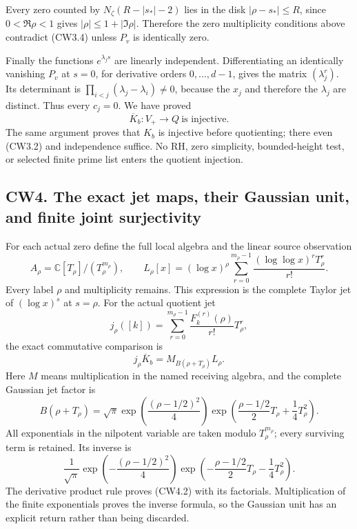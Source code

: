 Every zero counted by \(N_\zeta(R-|s_*|-2)\) lies in the disk
\(|\rho-s_*|\le R\), since \(0<\Re\rho<1\) gives
\(|\rho|\le1+|\Im\rho|\). Therefore the zero multiplicity conditions
above contradict (CW3.4) unless \(P_v\) is identically zero.

Finally the functions \(e^{\lambda_js}\) are linearly independent.
Differentiating an identically vanishing \(P_v\) at \(s=0\), for
derivative orders \(0,\ldots,d-1\), gives the matrix \((\lambda_j^r)\).
Its determinant is \(\prod_{i<j}(\lambda_j-\lambda_i)\ne0\), because the
\(x_j\) and therefore the \(\lambda_j\) are distinct. Thus every
\(c_j=0\). We have proved \[
\boxed{\overline K_b:V_+\longrightarrow Q\ \text{is injective}.}
\tag{CW3.6}
\] The same argument proves that \(K_b\) is injective before
quotienting; there even (CW3.2) and independence suffice. No RH, zero
simplicity, bounded-height test, or selected finite prime list enters
the quotient injection.

\subsection{CW4. The exact jet maps, their Gaussian unit, and finite
joint
surjectivity}\label{cw4.-the-exact-jet-maps-their-gaussian-unit-and-finite-joint-surjectivity}

For each actual zero define the full local algebra and the linear source
observation \[
A_\rho=\mathbb C[T_\rho]/(T_\rho^{m_\rho}),\qquad
L_\rho[x]
=(\log x)^\rho
\sum_{r=0}^{m_\rho-1}
\frac{(\log\log x)^r T_\rho^r}{r!}.
\tag{CW4.1}
\] Every label \(\rho\) and multiplicity remains. This expression is the
complete Taylor jet of \((\log x)^s\) at \(s=\rho\). For the actual
quotient jet \[
j_\rho([k])=\sum_{r=0}^{m_\rho-1}
\frac{F_k^{(r)}(\rho)}{r!}T_\rho^r,
\] the exact commutative comparison is \[
\boxed{j_\rho\overline K_b
=M_{B(\rho+T_\rho)}L_\rho.}
\tag{CW4.2}
\] Here \(M\) means multiplication in the named receiving algebra, and
the complete Gaussian jet factor is \[
B(\rho+T_\rho)
=\sqrt{\pi}\exp\!\left(\frac{(\rho-1/2)^2}{4}\right)
\exp\!\left(\frac{\rho-1/2}{2}T_\rho+\frac14T_\rho^2\right).
\tag{CW4.3}
\] All exponentials in the nilpotent variable are taken modulo
\(T_\rho^{m_\rho}\); every surviving term is retained. Its inverse is \[
\frac1{\sqrt{\pi}}\exp\!\left(-\frac{(\rho-1/2)^2}{4}\right)
\exp\!\left(-\frac{\rho-1/2}{2}T_\rho-\frac14T_\rho^2\right).
\tag{CW4.4}
\] The derivative product rule proves (CW4.2) with its factorials.
Multiplication of the finite exponentials proves the inverse formula, so
the Gaussian unit has an explicit return rather than being discarded.

